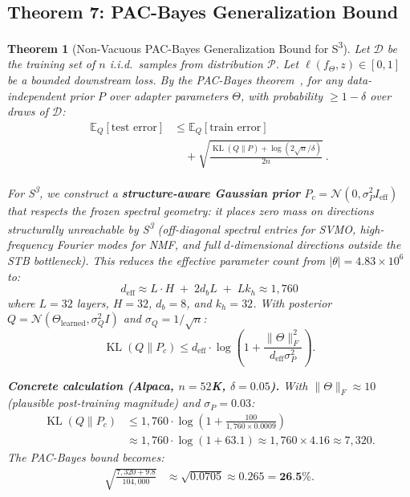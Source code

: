 \documentclass[conference]{IEEEtran}
\newtheorem{theorem}{Theorem}[section]
\newcommand{\KL}{\operatorname{KL}}
\begin{document}
\subsection{Theorem 7: PAC-Bayes Generalization Bound}

\begin{theorem}[Non-Vacuous PAC-Bayes Generalization Bound for S\textsuperscript{3}]
\label{thm:pacbayes}
Let $\mathcal{D}$ be the training set of $n$ i.i.d.\ samples from distribution $\mathcal{P}$. Let $\ell(f_\Theta, z) \in [0,1]$ be a bounded downstream loss. By the PAC-Bayes theorem~\cite{mcallester1999pac,catoni2007pac,alquier2023pac}, for any data-independent prior $P$ over adapter parameters $\Theta$, with probability $\geq 1-\delta$ over draws of $\mathcal{D}$:
\begin{align}
\mathbb{E}_Q[\text{test error}] &\leq \mathbb{E}_Q[\text{train error}] \label{eq:pacbayes-bound} \\
&\quad + \sqrt{\frac{\KL(Q\|P) + \log(2\sqrt{n}/\delta)}{2n}} \ .
\end{align}

For S\textsuperscript{3}, we construct a \textbf{structure-aware Gaussian prior} $P_c = \mathcal{N}(0, \sigma_P^2 I_{\text{eff}})$ that respects the frozen spectral geometry: it places zero mass on directions structurally unreachable by S\textsuperscript{3} (off-diagonal spectral entries for SVMO, high-frequency Fourier modes for NMF, and full $d$-dimensional directions outside the STB bottleneck). This reduces the effective parameter count from $|\theta| = 4.83\times 10^6$ to:
\begin{equation}
\boxed{
d_{\text{eff}} \approx L \cdot H \;+\; 2d_b L \;+\; L k_h \approx 1{,}760
}
\end{equation}
where $L=32$ layers, $H=32$, $d_b=8$, and $k_h=32$. With posterior $Q = \mathcal{N}(\Theta_{\text{learned}}, \sigma_Q^2 I)$ and $\sigma_Q = 1/\sqrt{n}$:
\begin{equation}
\KL(Q\|P_c) \leq d_{\text{eff}} \cdot \log\!\left(1 + \frac{\|\Theta\|_F^2}{d_{\text{eff}} \sigma_P^2}\right).
\end{equation}

\textbf{Concrete calculation (Alpaca, $n=52$K, $\delta=0.05$).}
With $\|\Theta\|_F \approx 10$ (plausible post-training magnitude) and $\sigma_P = 0.03$:
\begin{align}
\KL(Q\|P_c) &\leq 1{,}760 \cdot \log\!\left(1 + \frac{100}{1{,}760 \times 0.0009}\right) \nonumber\\
&\approx 1{,}760 \cdot \log(1 + 63.1) \approx 1{,}760 \times 4.16 \approx 7{,}320.
\end{align}
The PAC-Bayes bound becomes:
\begin{align}
\sqrt{\frac{7{,}320 + 9.8}{104{,}000}}
&\approx \sqrt{0.0705} \approx 0.265 = \textbf{26.5\%}.
\end{align}


\end{theorem}
\end{document}
